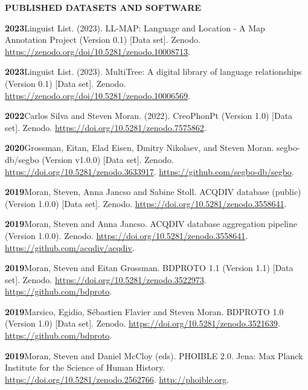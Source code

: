 \documentclass[11pt]{article}
\newcommand{\hangpara}{
 \setlength{\parindent}{0in} %
 \hangindent=0.42in %
}
\begin{document}
\vskip 20pt
\begin{flushleft}
{\bf PUBLISHED DATASETS AND SOFTWARE}
\end{flushleft}

\hangpara
{\bf 2023}\hspace{1ex}Linguist List. (2023). LL-MAP: Language and Location - A Map Annotation Project (Version 0.1) [Data set]. Zenodo. \url{https://zenodo.org/doi/10.5281/zenodo.10008713}.

\vskip 6pt
\hangpara
{\bf 2023}\hspace{1ex}Linguist List. (2023). MultiTree: A digital library of language relationships (Version 0.1) [Data set]. Zenodo. \url{https://zenodo.org/doi/10.5281/zenodo.10006569}.

\vskip 6pt
\hangpara
{\bf 2022}\hspace{1ex}Carlos Silva and Steven Moran. (2022). CreoPhonPt (Version 1.0) [Data set]. Zenodo. \url{https://doi.org/10.5281/zenodo.7575862}.

\vskip 6pt
\hangpara
{\bf 2020}\hspace{1ex}Grossman, Eitan, Elad Eisen, Dmitry Nikolaev, and Steven Moran. segbo-db/segbo (Version v1.0.0) [Data set]. Zenodo. \url{https://doi.org/10.5281/zenodo.3633917}. \url{https://github.com/segbo-db/segbo}.

\vskip 6pt
\hangpara
{\bf 2019}\hspace{1ex}Moran, Steven, Anna Jancso and Sabine Stoll. ACQDIV database (public) (Version 1.0.0) [Data set]. Zenodo. \url{https://doi.org/10.5281/zenodo.3558641}.

\vskip 6pt
\hangpara
{\bf 2019}\hspace{1ex}Moran, Steven and Anna Jancso. ACQDIV database aggregation pipeline (Version 1.0.0). Zenodo. \url{https://doi.org/10.5281/zenodo.3558641}. \url{https://github.com/acqdiv/acqdiv}.

\vskip 6pt
\hangpara
{\bf 2019}\hspace{1ex}Moran, Steven and Eitan Grossman. BDPROTO 1.1 (Version 1.1) [Data set]. Zenodo. \url{https://doi.org/10.5281/zenodo.3522973}. \url{https://github.com/bdproto}.

\vskip 6pt
\hangpara
{\bf 2019}\hspace{1ex}Marsico, Egidio, Sébastien Flavier and Steven Moran. BDPROTO 1.0 (Version 1.0) [Data set]. Zenodo. \url{https://doi.org/10.5281/zenodo.3521639}. \url{https://github.com/bdproto}.

\vskip 6pt
\hangpara
{\bf 2019}\hspace{1ex}Moran, Steven and Daniel McCloy (eds). PHOIBLE 2.0. Jena: Max Planck Institute for the Science of Human History. \url{https://doi.org/10.5281/zenodo.2562766}. \url{http://phoible.org}.
\end{document}
